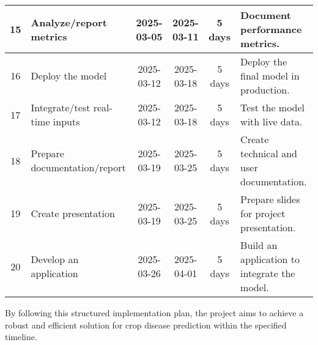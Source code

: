 \begin{longtable}{|c|p{4cm}|c|c|c|p{4cm}|}
15 & Analyze/report metrics & 2025-03-05 & 2025-03-11 & 5 days & Document performance metrics. \\ \hline
16 & Deploy the model & 2025-03-12 & 2025-03-18 & 5 days & Deploy the final model in production. \\ \hline
17 & Integrate/test real-time inputs & 2025-03-12 & 2025-03-18 & 5 days & Test the model with live data. \\ \hline
18 & Prepare documentation/report & 2025-03-19 & 2025-03-25 & 5 days & Create technical and user documentation. \\ \hline
19 & Create presentation & 2025-03-19 & 2025-03-25 & 5 days & Prepare slides for project presentation. \\ \hline
20 & Develop an application & 2025-03-26 & 2025-04-01 & 5 days & Build an application to integrate the model. \\ \hline
\end{longtable}


By following this structured implementation plan, the project aims to achieve a robust and efficient solution for crop disease prediction within the specified timeline.
